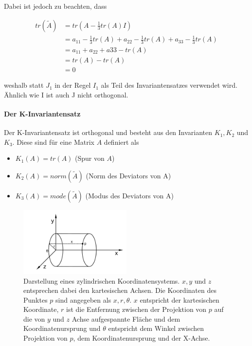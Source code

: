 \documentclass[a4paper,fontsize=12pt,toc=bib,halfparskip]{scrartcl}
\begin{document}
Dabei ist jedoch zu beachten, dass

\begin{equation}
	\begin{split}
	tr(\tilde{A}) &= tr(A - \frac{1}{3}tr(A)I)\\
	&= a_{11} - \frac{1}{3} tr(A) + a_{22} - \frac{1}{3} tr(A) + a_{33} - \frac{1}{3} tr(A)\\
	&= a_{11} + a_{22} + a{33} - tr(A)\\
	&= tr(A) - tr(A)\\
	&= 0
	\end{split}
\end{equation}

weshalb statt $J_1$ in der Regel $I_1$ als Teil des Invariantensatzes verwendet wird. \"Ahnlich wie I ist auch J nicht orthogonal.

\paragraph{Der K-Invariantensatz}
Der K-Invariantensatz ist orthogonal und besteht aus den Invarianten $K_1, K_2$ und $K_3$. Diese sind f\"ur eine Matrix $A$ definiert als

\begin{itemize}
	\item $K_1(A)=tr(A)$ (Spur von $A$)
	\item $K_2(A)=norm(\tilde{A})$ (Norm des Deviators von A)
	\item $K_3(A)=mode(\tilde{A})$ (Modus des Deviators von A)
\end{itemize}


\begin{figure}
	\centering
	\includegraphics[width=0.5\textwidth]{pictures/cylinder}
	\caption{Darstellung eines zylindrischen Koordinatensystems. $x,y$ und $z$ entsprechen dabei den kartesischen Achsen. Die Koordinaten des Punktes $p$ sind angegeben als $x, r, \theta$. $x$ entspricht der kartesischen Koordinate, $r$ ist die Entfernung zwischen der Projektion von $p$ auf die von $y$ und $z$ Achse aufgespannte Fl\"ache und dem Koordinatenursprung und $\theta$ entspricht dem Winkel zwischen Projektion von $p$, dem Koordinatenursprung und der X-Achse. }
	\label{cylinderCoords}
\end{figure}
\end{document}
